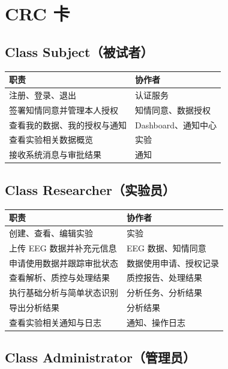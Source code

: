 \section{CRC 卡}

\subsection{Class Subject（被试者）}

\begin{longtable}{|p{84mm}|p{54mm}|}
\hline
\textbf{职责} & \textbf{协作者} \\
\hline
注册、登录、退出 & 认证服务 \\
\hline
签署知情同意并管理本人授权 & 知情同意、数据授权 \\
\hline
查看我的数据、我的授权与通知 & Dashboard、通知中心 \\
\hline
查看实验相关数据概览 & 实验 \\
\hline
接收系统消息与审批结果 & 通知 \\
\hline
\end{longtable}

\subsection{Class Researcher（实验员）}

\begin{longtable}{|p{84mm}|p{54mm}|}
\hline
\textbf{职责} & \textbf{协作者} \\
\hline
创建、查看、编辑实验 & 实验 \\
\hline
上传 EEG 数据并补充元信息 & EEG 数据、知情同意 \\
\hline
申请使用数据并跟踪审批状态 & 数据使用申请、授权记录 \\
\hline
查看解析、质控与处理结果 & 质控报告、处理结果 \\
\hline
执行基础分析与简单状态识别 & 分析任务、分析结果 \\
\hline
导出分析结果 & 分析结果 \\
\hline
查看实验相关通知与日志 & 通知、操作日志 \\
\hline
\end{longtable}

\subsection{Class Administrator（管理员）}

